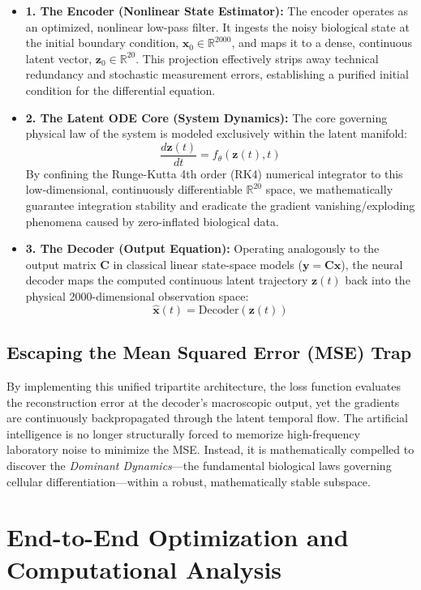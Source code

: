 \documentclass[12pt, a4paper]{article}
\begin{document}
	\begin{itemize}
		\item \textbf{1. The Encoder (Nonlinear State Estimator):} The encoder operates as an optimized, nonlinear low-pass filter. It ingests the noisy biological state at the initial boundary condition, $\mathbf{x}_0 \in \mathbb{R}^{2000}$, and maps it to a dense, continuous latent vector, $\mathbf{z}_0 \in \mathbb{R}^{20}$. This projection effectively strips away technical redundancy and stochastic measurement errors, establishing a purified initial condition for the differential equation.
		
		\item \textbf{2. The Latent ODE Core (System Dynamics):} The core governing physical law of the system is modeled exclusively within the latent manifold:
		$$ \frac{d\mathbf{z}(t)}{dt} = f_\theta(\mathbf{z}(t), t) $$
		By confining the Runge-Kutta 4th order (RK4) numerical integrator to this low-dimensional, continuously differentiable $\mathbb{R}^{20}$ space, we mathematically guarantee integration stability and eradicate the gradient vanishing/exploding phenomena caused by zero-inflated biological data.
		
		\item \textbf{3. The Decoder (Output Equation):} Operating analogously to the output matrix $\mathbf{C}$ in classical linear state-space models ($\mathbf{y} = \mathbf{C}\mathbf{x}$), the neural decoder maps the computed continuous latent trajectory $\mathbf{z}(t)$ back into the physical 2000-dimensional observation space:
		$$ \mathbf{\hat{x}}(t) = \text{Decoder}(\mathbf{z}(t)) $$
	\end{itemize}
	
	\subsection{Escaping the Mean Squared Error (MSE) Trap}
	By implementing this unified tripartite architecture, the loss function evaluates the reconstruction error at the decoder's macroscopic output, yet the gradients are continuously backpropagated through the latent temporal flow. The artificial intelligence is no longer structurally forced to memorize high-frequency laboratory noise to minimize the MSE. Instead, it is mathematically compelled to discover the \textit{Dominant Dynamics}—the fundamental biological laws governing cellular differentiation—within a robust, mathematically stable subspace.
	
	\section{End-to-End Optimization and Computational Analysis}
	
\end{document}

